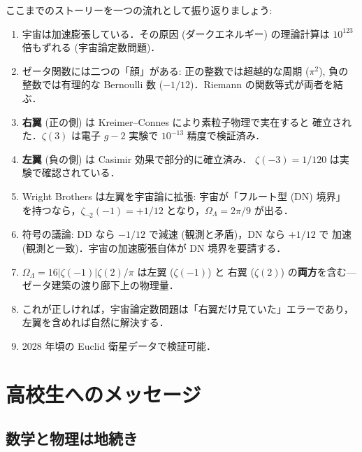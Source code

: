 \documentclass[11pt,a4paper]{article}
\begin{document}
ここまでのストーリーを一つの流れとして振り返りましょう:

\begin{enumerate}
\item 宇宙は加速膨張している．その原因 (ダークエネルギー) の理論計算は
$10^{123}$ 倍もずれる (宇宙論定数問題)．

\item ゼータ関数には二つの「顔」がある: 正の整数では超越的な周期 ($\pi^2$),
負の整数では有理的な Bernoulli 数 ($-1/12$)．Riemann の関数等式が両者を結ぶ．

\item \textbf{右翼} (正の側) は Kreimer--Connes により素粒子物理で実在すると
確立された．$\zeta(3)$ は電子 $g-2$ 実験で $10^{-13}$ 精度で検証済み．

\item \textbf{左翼} (負の側) は Casimir 効果で部分的に確立済み．
$\zeta(-3) = 1/120$ は実験で確認されている．

\item Wright Brothers は左翼を宇宙論に拡張: 宇宙が「フルート型 (DN) 境界」
を持つなら，$\zeta_{\neg 2}(-1) = +1/12$ となり，$\Omega_\Lambda = 2\pi/9$
が出る．

\item 符号の議論: DD なら $-1/12$ で減速 (観測と矛盾)，DN なら $+1/12$ で
加速 (観測と一致)．宇宙の加速膨張自体が DN 境界を要請する．

\item $\Omega_\Lambda = 16|\zeta(-1)|\zeta(2)/\pi$ は左翼 ($\zeta(-1)$) と
右翼 ($\zeta(2)$) の\textbf{両方}を含む---ゼータ建築の渡り廊下上の物理量．

\item これが正しければ，宇宙論定数問題は「右翼だけ見ていた」エラーであり，
左翼を含めれば自然に解決する．

\item 2028 年頃の Euclid 衛星データで検証可能．
\end{enumerate}

\section{高校生へのメッセージ}

\subsection{数学と物理は地続き}
\end{document}
